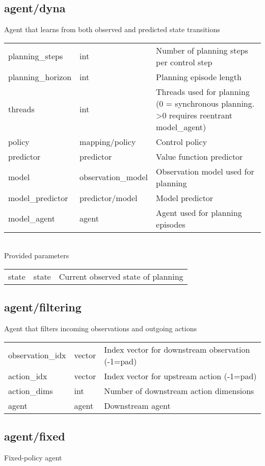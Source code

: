 \subsection{agent/dyna}
\noindent Agent that learns from both observed and predicted state transitions\\

\noindent\begin{tabular}{@{}lll@{}}
planning\_steps&int&Number of planning steps per control step\\
planning\_horizon&int&Planning episode length\\
threads&int&Threads used for planning (0 = synchronous planning. >0 requires reentrant model\_agent)\\
policy&mapping/policy&Control policy\\
predictor&predictor&Value function predictor\\
model&observation\_model&Observation model used for planning\\
model\_predictor&predictor/model&Model predictor\\
model\_agent&agent&Agent used for planning episodes\\
\end{tabular}
\\

\noindent Provided parameters\\

\noindent\begin{tabular}{@{}lll@{}}
state&state&Current observed state of planning\\
\end{tabular}
\subsection{agent/filtering}
\noindent Agent that filters incoming observations and outgoing actions\\

\noindent\begin{tabular}{@{}lll@{}}
observation\_idx&vector&Index vector for downstream observation (-1=pad)\\
action\_idx&vector&Index vector for upstream action (-1=pad)\\
action\_dims&int&Number of downstream action dimensions\\
agent&agent&Downstream agent\\
\end{tabular}
\subsection{agent/fixed}
\noindent Fixed-policy agent\\

